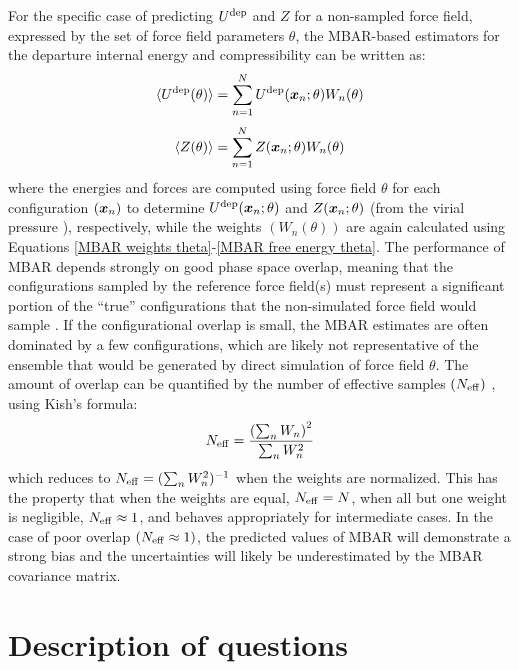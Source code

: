 \documentclass[11pt,a4paper]{article}
\newcommand{\bfv}[1]{{\mbox{\boldmath{$#1$}}}}
\newcommand{\x}{\bfv{x}}
\begin{document}
For the specific case of predicting $U^{\rm dep}$ and $Z$ for a non-sampled force field, expressed by the set of force field parameters $\theta$, the MBAR-based estimators for the departure internal energy and compressibility can be written as:
\begin{eqnarray} \label{MBAR U theta}
\langle U^{\rm dep}(\theta)\rangle = \sum_{n=1}^{N} U^{\rm dep}(\x_{n};\theta) W_{n}(\theta) 
\end{eqnarray}
\begin{eqnarray} \label{MBAR Z theta}
\langle Z(\theta)\rangle = \sum_{n=1}^{N} Z(\x_{n};\theta) W_{n}(\theta) 
\end{eqnarray}
where the energies and forces are computed using force field $\theta$ for each configuration $(\x_{n})$ to determine $U^{\rm dep}(\x_{n};\theta)$ and $Z(\x_{n};\theta)$ (from the virial pressure \cite{Allen1987}), respectively, while the weights $(W_n(\theta))$ are again calculated using Equations \ref{MBAR weights theta}-\ref{MBAR free energy theta}.
The performance of MBAR depends strongly on good phase space overlap, meaning that the configurations sampled by the reference force field(s) must represent a significant portion of the ``true'' configurations that the non-simulated force field would sample \cite{naden:jctc:2016}. If the configurational overlap is small, the MBAR estimates are often dominated by a few configurations, which are likely not representative of the ensemble that would be generated by direct simulation of force field $\theta$. The amount of overlap can be quantified by the number of effective samples $(N_{\rm eff})$ \cite{Dybeck2016}, using Kish's formula:
\begin{eqnarray} \label{Neff}
N_{\rm eff} = \frac{\left(\sum_n W_n\right)^2}{\sum_n W_n^2}
\end{eqnarray}
which reduces to $N_{\rm eff} = (\sum_n W_n^2)^{-1}$ when the weights are
normalized. This has the property that when the weights are equal,
$N_{\rm eff} = N$, when all but one weight is negligible, $N_{\rm eff} \approx
1$, and behaves appropriately for intermediate cases. 
In the case of poor overlap $(N_{\rm eff} \approx 1)$, the predicted values of MBAR will demonstrate a strong bias and the uncertainties will likely be underestimated by the MBAR covariance matrix. 

\section{Description of questions}
\end{document}
